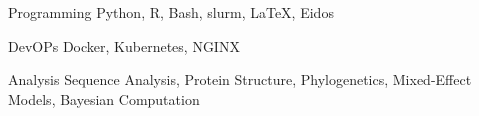 

\begin{cvskills}

  \cvskill
    {Programming}
	{Python, R, Bash, slurm, LaTeX, Eidos}

  \cvskill
    {DevOPs}
	{Docker, Kubernetes, NGINX}

  \cvskill
    {Analysis}
	{Sequence Analysis, Protein Structure, Phylogenetics, Mixed-Effect Models, Bayesian Computation}
	
\end{cvskills}